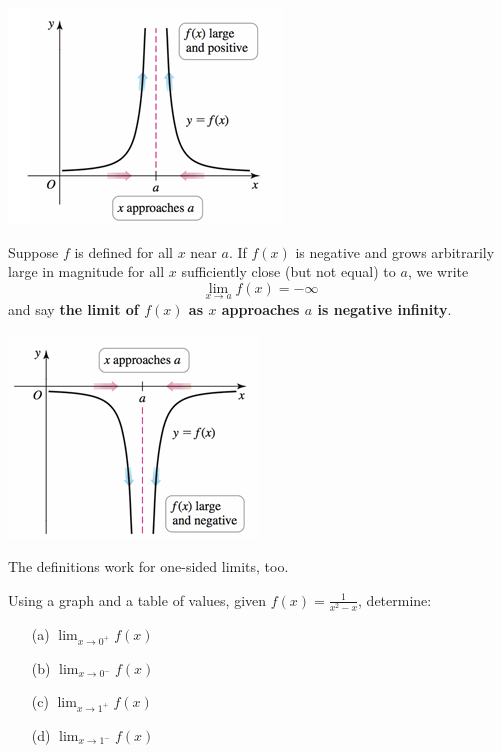 \documentclass[Cal1Spr16Lectures.tex]{subfiles}
\begin{document}
\begin{frame}
\begin{center}
\noindent\includegraphics[scale=1]{pictures/Fig2_24a}
\end{center}
\end{frame}

\begin{frame}
\begin{dfn} Suppose $f$ is defined for all $x$ near $a$.  If $f(x)$ is negative and grows arbitrarily large in magnitude for all $x$ sufficiently close (but not equal) to $a$, we write
\[\lim_{x \to a} f(x) = -\infty\]
and say {\bf the limit of $f(x)$ as $x$ approaches $a$ is negative infinity}. \end{dfn}
\end{frame}

\begin{frame}
\begin{center}
\noindent\includegraphics[scale=1]{pictures/Fig2_24b} 
\end{center}
\end{frame}

\begin{frame}\footnotesize
The definitions work for one-sided limits, too.  

\vspace{1.5pc}
\begin{exe} Using a graph and a table of values, given $f(x)=\displaystyle\frac{1}{x^2-x}$, determine:
\begin{itemize}
\item[(a)\;] $\displaystyle\lim_{x \to 0^+} f(x)$
\item[(b)\;] $\displaystyle\lim_{x \to 0^-} f(x)$
\item[(c)\;] $\displaystyle\lim_{x \to 1^+} f(x)$
\item[(d)\;] $\displaystyle\lim_{x \to 1^-} f(x)$ 
\end{itemize}
\end{exe}
\end{frame}
\end{document}
